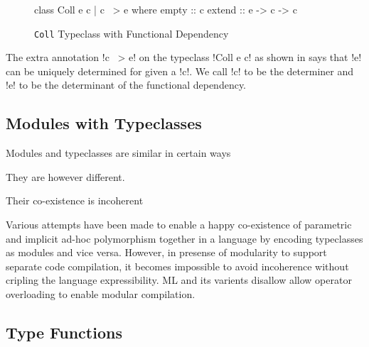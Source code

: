 \documentclass[manuscript,screen,nonacm]{acmart}
\begin{document}
\begin{figure}[ht]
  \begin{center}
    \begin{code}
      class Coll e c | c ~> e where
          empty :: c
          extend :: e -> c -> c
    \end{code}
  \end{center}
  \caption[Coll typeclass]{\lstinline{Coll} Typeclass with Functional Dependency}
  \label{fig:tc-collection-fd}
\end{figure}

The extra annotation !c ~> e! on the typeclass !Coll e c! as shown in  says that !e! can be uniquely determined for given a !c!.
We call !c! to be the determiner and !e! to be the determinant of the functional dependency.

%


\subsection{Modules with Typeclasses}
Modules and typeclasses are similar in certain ways

They are however different.

Their co-existence is incoherent

Various attempts\cite{dreyer_modular_2007, wehr_ml_2008, white_modular_2014} have been made to enable a happy co-existence of parametric and implicit ad-hoc polymorphism together in a language by encoding typeclasses as modules and vice versa. However, in presense of modularity to support separate code compilation, it becomes impossible to avoid incoherence without cripling the language expressibility.
ML and its varients\cite{milner_definition_1997,leroy_ocaml_2023} disallow allow operator overloading to enable modular compilation.

\subsection{Type Functions}
\end{document}
